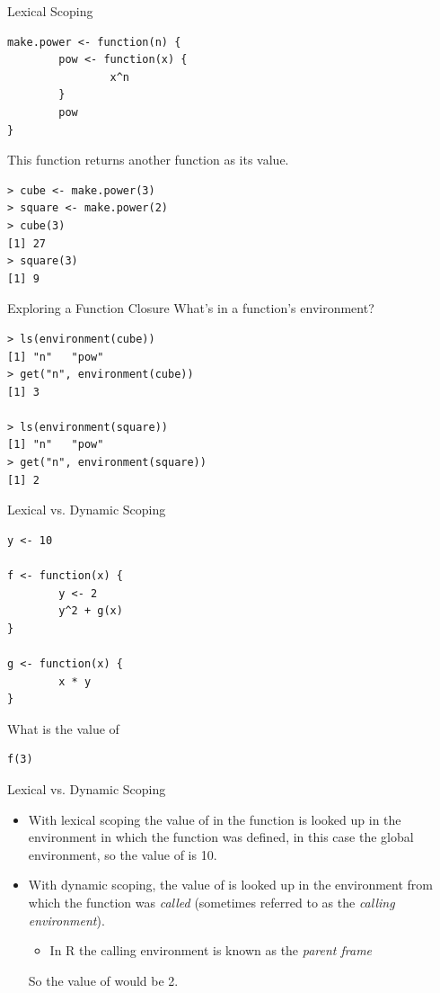 \documentclass[aspectratio=169]{beamer}
\begin{document}
\begin{frame}[fragile]{Lexical Scoping}
\begin{verbatim}
make.power <- function(n) {
        pow <- function(x) {
                x^n
        }
        pow
}
\end{verbatim}
This function returns another function as its value.
\begin{verbatim}
> cube <- make.power(3)
> square <- make.power(2)
> cube(3)
[1] 27
> square(3)
[1] 9
\end{verbatim}
\end{frame}

\begin{frame}[fragile]{Exploring a Function Closure}
What's in a function's environment?
\begin{verbatim}
> ls(environment(cube))
[1] "n"   "pow"
> get("n", environment(cube))
[1] 3

> ls(environment(square))
[1] "n"   "pow"
> get("n", environment(square))
[1] 2
\end{verbatim}
\end{frame}

\begin{frame}[fragile]{Lexical vs. Dynamic Scoping}
\begin{verbatim}
y <- 10

f <- function(x) {
        y <- 2
        y^2 + g(x)
}

g <- function(x) {
        x * y
}
\end{verbatim}
What is the value of
\begin{verbatim}
f(3)
\end{verbatim}
\end{frame}

\begin{frame}[fragile]{Lexical vs. Dynamic Scoping}
\begin{itemize}
\item
With lexical scoping the value of  in the function  is
looked up in the environment in which the function was defined, in
this case the global environment, so the value of  is 10.
\item
With dynamic scoping, the value of  is looked up in the
environment from which the function was \textit{called} (sometimes
referred to as the \textit{calling environment}).
\begin{itemize}
\item
In R the calling environment is known as the \textit{parent frame}
\end{itemize}
So the value of  would be 2.
\end{itemize}
\end{frame}
\end{document}
